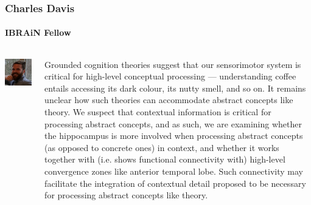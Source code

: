 \documentclass[aspectratio=169]{beamer}
\begin{document}
\begin{frame}
	\frametitle{Charles Davis}
	\framesubtitle{IBRAiN Fellow}

	\begin{columns}[T]
		\begin{column}{.25\textwidth}
			\includegraphics[width=\textwidth]{img/davis.jpg}
		\end{column}

		\begin{column}{.75\textwidth}
			Grounded cognition theories suggest that our sensorimotor system is critical for high-level conceptual processing --- understanding coffee entails accessing its dark colour, its nutty smell, and so on. It remains unclear how such theories can accommodate abstract concepts like theory. We suspect that contextual information is critical for processing abstract concepts, and as such, we are examining whether the hippocampus is more involved when processing abstract concepts (as opposed to concrete ones) in context, and whether it works together with (i.e. shows functional connectivity with) high-level convergence zones like anterior temporal lobe. Such connectivity may facilitate the integration of contextual detail proposed to be necessary for processing abstract concepts like theory.
		\end{column}
	\end{columns}
\end{frame}
\end{document}
